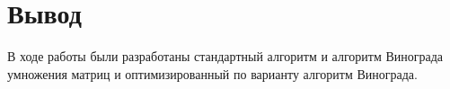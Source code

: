 


\section{Вывод}

В ходе работы были разработаны стандартный алгоритм и алгоритм Винограда умножения матриц и оптимизированный по варианту алгоритм Винограда.

\clearpage
